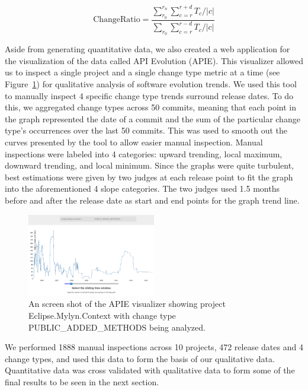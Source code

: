 \documentclass[conference]{IEEEtran}
\begin{document}
\begin{equation}
\text{ChangeRatio} = \frac{ \sum_{r_0}^{r_n}\sum_{c=r}^{r+d} T_c / |c|} { \sum_{r_0}\sum_{c=r}^{r-d} T_c / |c|}
\label{eq:norm}
\end{equation}

Aside from generating quantitative data, we also created a web application for the visualization of the data called API Evolution (APIE). This visualizer allowed
us to inspect a single project and a single change type metric at a time (see Figure~\ref{fig:apie}) for qualitative analysis of software evolution trends. We
used this tool to manually inspect 4 specific change type trends surround release dates. To do this, we aggregated change types across 50 commits, meaning that
each point in the graph represented the date of a commit and the sum of the particular change type's occurrences over the last 50 commits. This was used to smooth
out the curves presented by the tool to allow easier manual inspection. Manual inspections were labeled into 4 categories: upward trending, local maximum, downward
trending, and local minimum. Since the graphs were quite turbulent, best estimations were given by two judges at each release point to fit the graph into the aforementioned
4 slope categories. The two judges used 1.5 months before and after the release date as start and end points for the graph trend line.

\begin{figure}[tb!]
\centering
\includegraphics[width=0.5\textwidth]{images/apie.png}
\caption{An screen shot of the APIE visualizer showing project Eclipse.Mylyn.Context with change type PUBLIC\_ADDED\_METHODS being analyzed.\label{fig:apie}}
\end{figure}

We performed 1888 manual inspections across 10 projects, 472 release dates and 4 change types, and used this data to form the basis of our qualitative data.
Quantitative data was cross validated with qualitative data to form some of the final results to be seen in the next section. 
\end{document}
